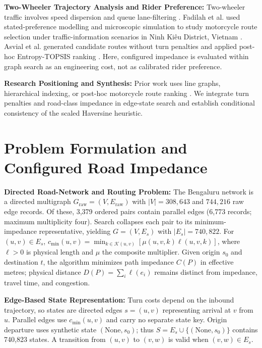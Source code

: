 \documentclass[11pt,conference]{IEEEtran}
\begin{document}
\noindent\textbf{Two-Wheeler Trajectory Analysis and Rider Preference:} Two-wheeler traffic involves speed dispersion and queue lane-filtering \cite{kotagi2020modeling,promraksa2022lane}. Fadilah et al. used stated-preference modelling and microscopic simulation to study motorcycle route selection under traffic-information scenarios in Ninh Ki\^{e}u District, Vietnam \cite{fadilah2024identifying}. Asvial et al. generated candidate routes without turn penalties and applied post-hoc Entropy-TOPSIS ranking \cite{asvial2020entropy}. Here, configured impedance is evaluated within graph search as an engineering cost, not as calibrated rider preference.

\noindent\textbf{Research Positioning and Synthesis:} Prior work uses line graphs, hierarchical indexing, or post-hoc motorcycle route ranking \cite{winter2002modeling,geisberger2011efficient,asvial2020entropy,zografos2004heuristic,kumar2025realtime}. We integrate turn penalties and road-class impedance in edge-state search and establish conditional consistency of the scaled Haversine heuristic.

\section{Problem Formulation and Configured Road Impedance}

\noindent\textbf{Directed Road-Network and Routing Problem:} The Bengaluru network is a directed multigraph $G_{\mathrm{raw}}=(V,E_{\mathrm{raw}})$ with $|V|=308{,}643$ and $744{,}216$ raw edge records. Of these, 3,379 ordered pairs contain parallel edges (6,773 records; maximum multiplicity four). Search collapses each pair to its minimum-impedance representative, yielding $G=(V,E_s)$ with $|E_s|=740{,}822$. For $(u,v)\in E_s$, $c_{\min}(u,v)=\min_{k\in\mathcal{K}(u,v)}[\mu(u,v,k)\ell(u,v,k)]$, where $\ell>0$ is physical length and $\mu$ the composite multiplier. Given origin $s_0$ and destination $t$, the algorithm minimizes path impedance $C(P)$ in effective metres; physical distance $D(P)=\sum_i\ell(e_i)$ remains distinct from impedance, travel time, and congestion.

\noindent\textbf{Edge-Based State Representation:} Turn costs depend on the inbound trajectory, so states are directed edges $s=(u,v)$ representing arrival at $v$ from $u$. Parallel edges use $c_{\min}(u,v)$ and carry no separate state key. Origin departure uses synthetic state $(\mathrm{None},s_0)$; thus $S=E_s\cup\{(\mathrm{None},s_0)\}$ contains 740,823 states. A transition from $(u,v)$ to $(v,w)$ is valid when $(v,w)\in E_s$.
\end{document}
